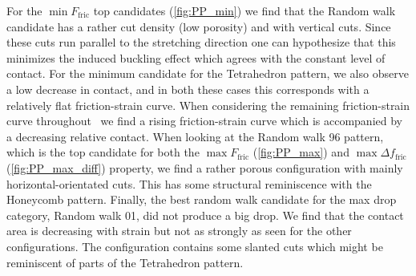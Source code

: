 For the $\min F_{\text{fric}}$ top candidates (\cref{fig:PP_min}) we find that
the Random walk candidate has a rather cut density (low porosity) and with
vertical cuts. Since these cuts run parallel to the stretching direction one can
hypothesize that this minimizes the induced buckling effect which agrees with
the constant level of contact. For the minimum candidate for the Tetrahedron
pattern, we also observe a low decrease in contact, and in both these cases this
corresponds with a relatively flat friction-strain curve. When considering the
remaining friction-strain curve
throughout~ we find a rising
friction-strain curve which is accompanied by a decreasing relative contact.
When looking at the Random walk 96 pattern, which is the top candidate for both
the $\max F_{\text{fric}}$ (\cref{fig:PP_max}) and $\max \Delta f_{\text{fric}}$
(\cref{fig:PP_max_diff}) property, we find a rather porous configuration with
mainly horizontal-orientated cuts. This has some structural reminiscence with the Honeycomb pattern. Finally, the best random walk candidate for the max drop category, Random walk 01, did not produce a big drop. We find that the contact area is decreasing with strain but not as strongly as seen for the other configurations. The configuration contains some slanted cuts which might be reminiscent of parts of the Tetrahedron pattern. 





